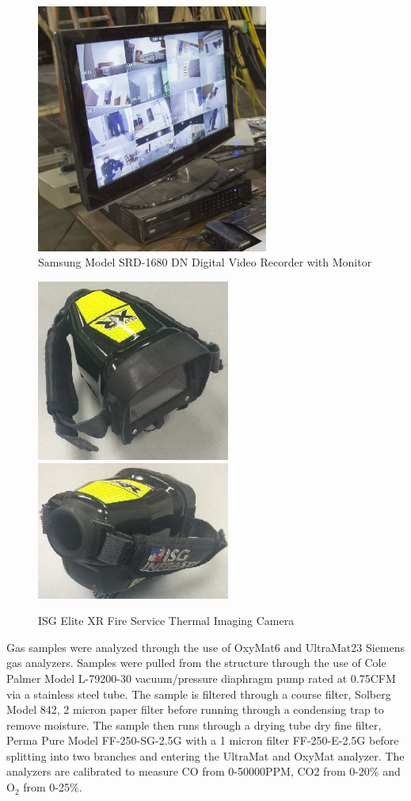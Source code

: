 \documentclass{article}
\begin{document}
\begin{figure} [H]
	\centering
	\includegraphics[width = 3in]{0_Images/Instrumentation/DVR.jpg}

	\caption{Samsung Model SRD-1680 DN Digital Video Recorder with Monitor}
	\label{fig:DVR}
\end{figure}

\begin{figure} [H]
	\centering
	\includegraphics[width = 2.5in]{0_Images/Instrumentation/ISG_IR.jpg}
	\includegraphics[width = 2.5in]{0_Images/Instrumentation/ISG_IR2.jpg}
	\caption{ISG Elite XR Fire Service Thermal Imaging Camera}
	\label{fig:IRCam}
\end{figure}

Gas samples were analyzed through the use of OxyMat6 and UltraMat23 Siemens gas analyzers. Samples were pulled from the structure through the use of Cole Palmer Model L-79200-30 vacuum/pressure diaphragm pump rated at 0.75CFM via a stainless steel tube. The sample is filtered through a course filter, Solberg Model 842, 2 micron paper filter before running through a condensing trap to remove moisture. The sample then runs through a drying tube dry fine filter, Perma Pure Model FF-250-SG-2.5G with a 1 micron filter FF-250-E-2.5G before splitting into two branches and entering the UltraMat and OxyMat analyzer. The analyzers are calibrated to measure CO from 0-50000PPM, CO2 from 0-20\% and O$_2$ from 0-25\%. 
\end{document}
